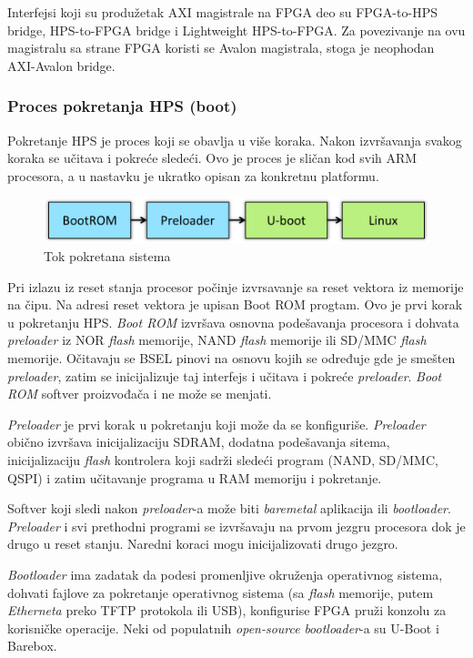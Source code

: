 Interfejsi koji su produžetak AXI magistrale na FPGA deo su FPGA-to-HPS bridge, HPS-to-FPGA bridge i Lightweight HPS-to-FPGA. Za povezivanje na ovu magistralu sa strane FPGA koristi se Avalon magistrala, stoga je neophodan AXI-Avalon bridge.

\subsubsection{Proces pokretanja HPS (boot)}
Pokretanje HPS je proces koji se obavlja u više koraka. Nakon izvršavanja svakog koraka se učitava i pokreće sledeći. Ovo je proces je sličan kod svih ARM procesora, a u nastavku je ukratko opisan za konkretnu platformu.

\begin{figure}[h!]
\centering
\includegraphics[scale=1.]{img/gsrd-boot.png}
\caption{Tok pokretana sistema}
\label{slika1:gsrd}
\end{figure}

Pri izlazu iz reset stanja procesor počinje izvrsavanje sa reset vektora iz memorije na čipu. Na adresi reset vektora je upisan Boot ROM progtam. Ovo je prvi korak u pokretanju HPS. \textit{Boot ROM} izvršava osnovna podešavanja procesora i dohvata \textit{preloader} iz NOR \textit{flash} memorije, NAND \textit{flash} memorije ili SD/MMC \textit{flash} memorije. Očitavaju se BSEL pinovi na osnovu kojih se određuje gde je smešten \textit{preloader}, zatim se inicijalizuje taj interfejs i učitava i pokreće \textit{preloader}. \textit{Boot ROM} softver proizvođača i ne može se menjati. 

\textit{Preloader} je prvi korak u pokretanju koji može da se konfiguriše. \textit{Preloader} obično izvršava inicijalizaciju SDRAM, dodatna podešavanja sitema, inicijalizaciju \textit{flash} kontrolera koji sadrži sledeći program (NAND, SD/MMC, QSPI) i zatim učitavanje programa u RAM memoriju i pokretanje.

Softver koji sledi nakon \textit{preloader}-a može biti \textit{baremetal} aplikacija ili \textit{bootloader}. \textit{Preloader} i svi prethodni programi se izvršavaju na prvom jezgru procesora dok je drugo u reset stanju. Naredni koraci mogu inicijalizovati drugo jezgro.

\textit{Bootloader} ima zadatak da podesi promenljive okruženja operativnog sistema, dohvati fajlove za pokretanje operativnog sistema (sa \textit{flash} memorije, putem \textit{Etherneta} preko TFTP protokola ili USB), konfigurise FPGA pruži konzolu za korisničke operacije. Neki od populatnih \textit{open-source} \textit{bootloader}-a su U-Boot i Barebox.

